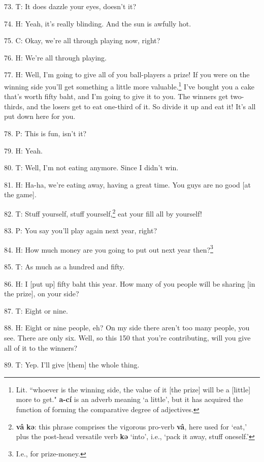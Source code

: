 73. T:  It does
dazzle your eyes, doesn't it?

74. H: Yeah, it's really blinding. And the sun is awfully hot.

75. C: Okay, we're all through playing now, right?

76. H: We're all through playing.


77. H: Well, I'm going to give all of you ball-players a prize! If you were on the
winning side you'll get something a little more valuable.\footnote{Lit. ``whoever is the winning side, the value of it [the prize] will be a [little] more to get." \textbf{a-cí} is an adverb meaning `a little', but it has acquired the function of forming the comparative degree of adjectives.} I've bought you a
cake that's worth fifty baht, and I'm going to give it to you. The winners get
two-thirds, and the losers get to eat one-third of it. So divide it up and eat
it! It's all put down here for you.

78. P: This is fun, isn't it?

79. H: Yeah.

80. T: Well, I'm not eating anymore. Since I didn't win.

81. H: Ha-ha, we're eating away, having a great time. You guys are no good [at the
game].

82. T: Stuff yourself, stuff yourself,\footnote{\textbf{vâ} \textbf{kə}: this phrase comprises the vigorous pro-verb \textbf{vâ}, here used for `eat,' plus the post-head versatile verb \textbf{kə} `into', i.e., `pack it away, stuff oneself.'} eat your fill all by yourself!

83. P: You say you'll play again next year, right?

84. H: How much money are you going to put out next year then?\footnote{I.e., for prize-money.}

85. T: As much as a hundred and fifty.

86. H: I [put up] fifty baht this year. How many of you people will be sharing [in
the prize], on your side?

87. T: Eight or nine.

88. H: Eight or nine people, eh? On my side there aren't too many people, you see.
There are only six. Well, so this 150 that you're contributing, will you give all
of it to the winners?

89. T: Yep. I'll give [them] the whole thing.

